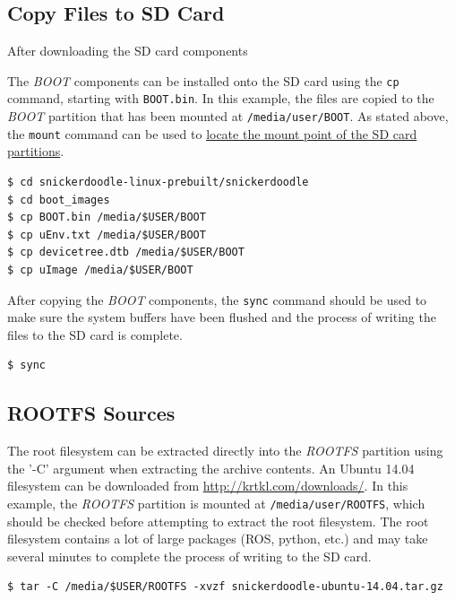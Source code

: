 \subsection{Copy Files to SD Card}
After downloading the SD card components


The \textit{BOOT} components can be installed onto the SD card using the \texttt{cp} command, starting with \texttt{BOOT.bin}. In this example, the files are copied to the \textit{BOOT} partition that has been mounted at \texttt{/media/user/BOOT}. As stated above, the \texttt{mount} command can be used to \hyperref[sub:locatesd]{locate the mount point of the SD card partitions}.


\begin{lstlisting}
$ cd snickerdoodle-linux-prebuilt/snickerdoodle
$ cd boot_images
$ cp BOOT.bin /media/$USER/BOOT
$ cp uEnv.txt /media/$USER/BOOT
$ cp devicetree.dtb /media/$USER/BOOT
$ cp uImage /media/$USER/BOOT
\end{lstlisting}


After copying the \textit{BOOT} components, the \texttt{sync} command should be used to make sure the system buffers have been flushed and the process of writing the files to the SD card is complete.


\begin{lstlisting}
$ sync
\end{lstlisting}


\subsection{ROOTFS Sources}

The root filesystem can be extracted directly into the \textit{ROOTFS} partition using the '-C' argument when extracting the archive contents. An Ubuntu 14.04 filesystem can be downloaded from \url{http://krtkl.com/downloads/}. In this example, the \textit{ROOTFS} partition is mounted at \texttt{/media/user/ROOTFS}, which should be checked before attempting to extract the root filesystem. The root filesystem contains a lot of large packages (ROS, python, etc.) and may take several minutes to complete the process of writing to the SD card.


\begin{fullwidth}
\begin{lstlisting}
$ tar -C /media/$USER/ROOTFS -xvzf snickerdoodle-ubuntu-14.04.tar.gz
\end{lstlisting}
\end{fullwidth}


